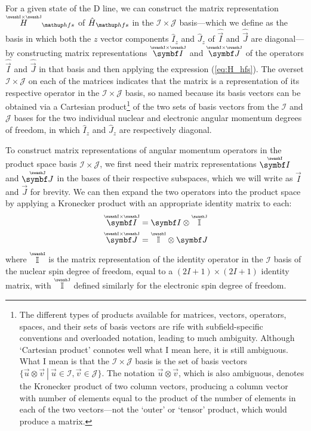 For a given state of the D line, we can construct the matrix representation $\oversetIJ H_\up{hfs}$ of $\hat H_\up{hfs}$ in the $\mathcal{I}\times\mathcal{J}$ basis---which we define as the basis in which both the $z$ vector components $\hat{I}_z$ and $\hat{J}_z$ of $\hat{\vec I}$ and $\hat{\vec J}$ are diagonal---by constructing matrix representations $\oversetIJ{\vec I}$ and $\oversetIJ{\vec J}$ of the operators $\hat{\vec I}$ and $\hat{\vec J}$ in that basis and then applying the expression (\ref{eq:H_hfs}). The overset ${\mathcal{I} \times \mathcal{J}}$ on each of the matrices indicates that the matrix is a representation of its respective operator in the ${\mathcal{I} \times \mathcal{J}}$ basis, so named because its basis vectors can be obtained via a Cartesian product\footnote{The different types of products available for matrices, vectors, operators, spaces, and their sets of basis vectors are rife with subfield-specific conventions and overloaded notation, leading to much ambiguity. Although `Cartesian product' connotes well what I mean here, it is still ambiguous. What I mean is that the ${\mathcal{I} \times \mathcal{J}}$ basis is the set of basis vectors $\{\left.\vec u \otimes \vec v\ \right|\ \vec u \in \mathcal{I}, \vec v\in\mathcal{J}\}$. The notation $\vec u \otimes \vec v$, which is also ambiguous, denotes the Kronecker product of two column vectors, producing a column vector with number of elements equal to the product of the number of elements in each of the two vectors---not the `outer' or `tensor' product, which would produce a matrix.} of the two sets of basis vectors from the $\mathcal{I}$ and $\mathcal{J}$ bases for the two individual nuclear and electronic angular momentum degrees of freedom, in which $\hat{I}_z$ and $\hat{J}_z$ are respectively diagonal.

To construct matrix representations of angular momentum operators in the product space basis ${\mathcal{I} \times \mathcal{J}}$, we first need their matrix representations $\oversetI{\vec I}$ and $\oversetJ{\vec J}$ in the bases of their respective subspaces, which we will write as $\vec I$ and $\vec J$ for brevity. We can then expand the two operators into the product space by applying a Kronecker product with an appropriate identity matrix to each:
\begin{align}\label{eq:kronecker_identity_I}
\oversetIJ{\vec I}
 &= \vec I \otimes \oversetJ{\mathbb{I}}\\
\label{eq:kronecker_identity_J}
\oversetIJ{\vec J}
&= \oversetI{\mathbb{I}} \otimes \vec J
\end{align}
where $\oversetI{\mathbb{I}}$ is the matrix representation of the identity operator in the $\mathcal{I}$ basis of the nuclear spin degree of freedom, equal to a $(2I+1)\times(2I+1)$ identity matrix, with $\oversetJ{\mathbb{I}}$ defined similarly for the electronic spin degree of freedom.

